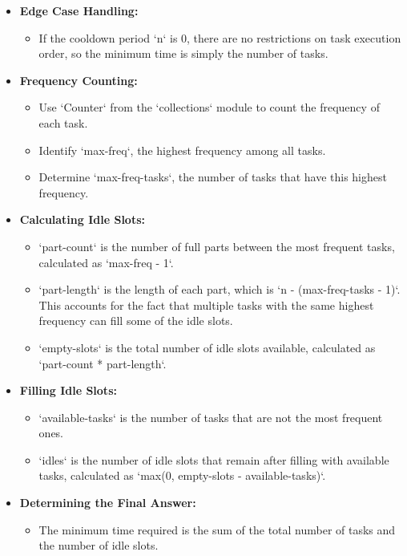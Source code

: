 \begin{itemize}
    \item \textbf{Edge Case Handling:}
    \begin{itemize}
        \item If the cooldown period `n` is 0, there are no restrictions on task execution order, so the minimum time is simply the number of tasks.
    \end{itemize}
    
    \item \textbf{Frequency Counting:}
    \begin{itemize}
        \item Use `Counter` from the `collections` module to count the frequency of each task.
        \item Identify `max-freq`, the highest frequency among all tasks.
        \item Determine `max-freq-tasks`, the number of tasks that have this highest frequency.
    \end{itemize}
    
    \item \textbf{Calculating Idle Slots:}
    \begin{itemize}
        \item `part-count` is the number of full parts between the most frequent tasks, calculated as `max-freq - 1`.
        \item `part-length` is the length of each part, which is `n - (max-freq-tasks - 1)`. This accounts for the fact that multiple tasks with the same highest frequency can fill some of the idle slots.
        \item `empty-slots` is the total number of idle slots available, calculated as `part-count * part-length`.
    \end{itemize}
    
    \item \textbf{Filling Idle Slots:}
    \begin{itemize}
        \item `available-tasks` is the number of tasks that are not the most frequent ones.
        \item `idles` is the number of idle slots that remain after filling with available tasks, calculated as `max(0, empty-slots - available-tasks)`.
    \end{itemize}
    
    \item \textbf{Determining the Final Answer:}
    \begin{itemize}
        \item The minimum time required is the sum of the total number of tasks and the number of idle slots.
    \end{itemize}
\end{itemize}

